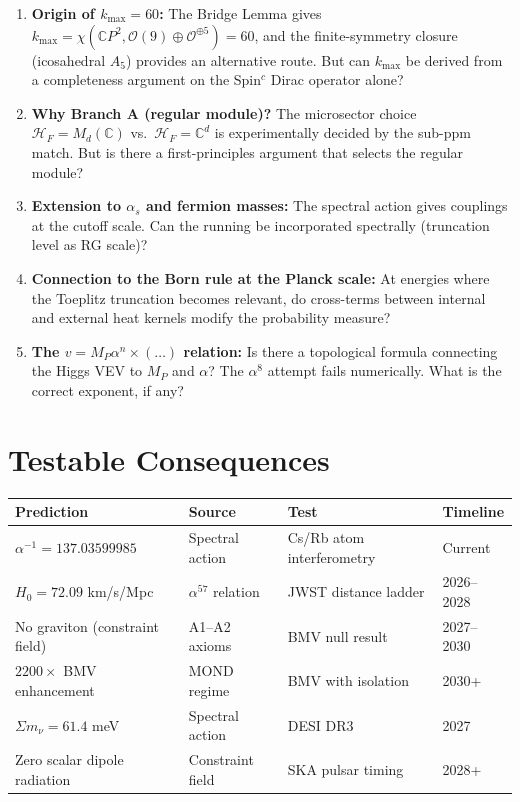 \documentclass[12pt,a4paper]{article}
\newcommand{\CP}{\mathbb{C}P}
\begin{document}
\begin{enumerate}
\item \textbf{Origin of $k_{\max} = 60$:} The Bridge Lemma gives $k_{\max} = \chi(\CP^2, \mathcal{O}(9) \oplus \mathcal{O}^{\oplus 5}) = 60$, and the finite-symmetry closure (icosahedral $A_5$) provides an alternative route. But can $k_{\max}$ be derived from a completeness argument on the Spin$^c$ Dirac operator alone?

\item \textbf{Why Branch A (regular module)?} The microsector choice $\mathcal{H}_F = M_d(\mathbb{C})$ vs.\ $\mathcal{H}_F = \mathbb{C}^d$ is experimentally decided by the sub-ppm match. But is there a first-principles argument that selects the regular module?

\item \textbf{Extension to $\alpha_s$ and fermion masses:} The spectral action gives couplings at the cutoff scale. Can the running be incorporated spectrally (truncation level as RG scale)?

\item \textbf{Connection to the Born rule at the Planck scale:} At energies where the Toeplitz truncation becomes relevant, do cross-terms between internal and external heat kernels modify the probability measure?

\item \textbf{The $v = M_P \alpha^n \times (\ldots)$ relation:} Is there a topological formula connecting the Higgs VEV to $M_P$ and $\alpha$? The $\alpha^8$ attempt fails numerically. What is the correct exponent, if any?
\end{enumerate}

\section{Testable Consequences}

\begin{center}
\renewcommand{\arraystretch}{1.3}
\begin{tabular}{llll}
\toprule
\textbf{Prediction} & \textbf{Source} & \textbf{Test} & \textbf{Timeline} \\
\midrule
$\alpha^{-1} = 137.03599985$ & Spectral action & Cs/Rb atom interferometry & Current \\
$H_0 = 72.09$ km/s/Mpc & $\alpha^{57}$ relation & JWST distance ladder & 2026--2028 \\
No graviton (constraint field) & A1--A2 axioms & BMV null result & 2027--2030 \\
$2200\times$ BMV enhancement & MOND regime & BMV with isolation & 2030+ \\
$\Sigma m_\nu = 61.4$ meV & Spectral action & DESI DR3 & 2027 \\
Zero scalar dipole radiation & Constraint field & SKA pulsar timing & 2028+ \\
\bottomrule
\end{tabular}
\end{center}
\end{document}
